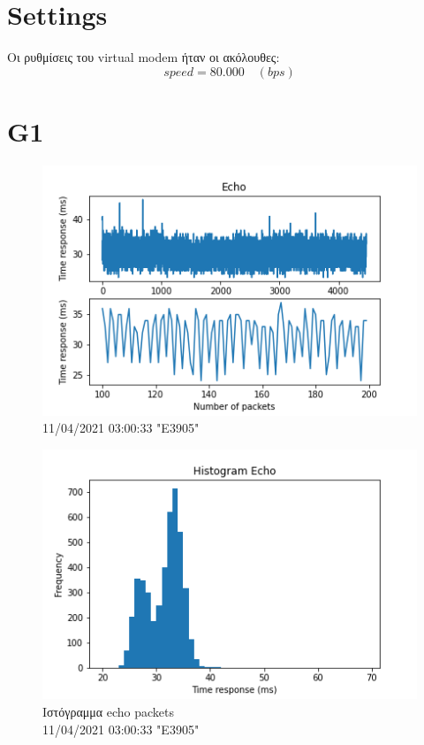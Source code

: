 \documentclass[hidelinks, 12pt, a4paper]{article}
\begin{document}



\pagebreak
{
\renewcommand*\contentsname{Περιεχόμενα}
\hypersetup{linkcolor=black}
\tableofcontents
}
\pagebreak


\section{Settings}

Οι ρυθμίσεις του virtual modem ήταν οι ακόλουθες:
\[speed = 80.000 \quad (bps)\]

\section{G1}

\begin{figure}[h!]
\centering
	\includegraphics[keepaspectratio, width=.7\textwidth]{echo.png}
	\caption{11/04/2021 03:00:33 "E3905"} 
\end{figure}

\begin{figure}[h!]
\centering
	\includegraphics[keepaspectratio, width=.7\textwidth]{hist_echo.png}
	\caption{Ιστόγραμμα echo packets \\ 11/04/2021 03:00:33 "E3905"} 
\end{figure}
\end{document}

